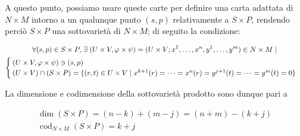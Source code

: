 {A questo punto, possiamo usare queste carte per definire una carta adattata di $ N \times M $ intorno a un qualunque punto $ (s,p) $ relativamente a $ S \times P $, rendendo perciò $ S \times P $ una sottovarietà di $ N \times M $; di seguito la condizione:

\begin{gather}
	\forall (s,p) \in S \times P, \, \exists \; (U \times V, \varphi \times \psi) = (U \times V; x^{1},\dots,x^{n}, y^{1},\dots,y^{m}) \in N \times M \mid \nonumber \\
	\begin{cases}
		(U \times V, \varphi \times \psi) \ni (s,p) \\
		(U \times V) \cap (S \times P) = \{ (r,t) \in U \times V \mid x^{k+1}(r) = \dots = x^{n}(r) = y^{j+1}(t) = \dots = y^{m}(t) = 0 \}
	\end{cases}
\end{gather}

La dimensione e codimensione della sottovarietà prodotto sono dunque pari a

\begin{gather}
	\dim(S \times P) = (n - k) + (m - j) = (n + m) - (k + j) \\
	\operatorname{cod}_{N \times M}(S \times P) = k + j
\end{gather}
}


